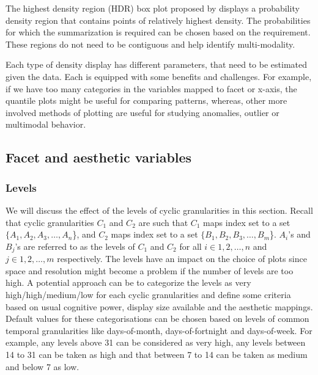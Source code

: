 \documentclass[12pt]{article}
\begin{document}
The highest density region (HDR) box plot proposed by \citep{Hyndman1996-ft} displays a probability density region that contains points of relatively highest density. The probabilities for which the summarization is required can be chosen based on the requirement. These regions do not need to be contiguous and help identify multi-modality.

Each type of density display has different parameters, that need to be estimated given the data. Each is equipped with some benefits and challenges. For example, if we have too many categories in the variables mapped to facet or x-axis, the quantile plots might be useful for comparing patterns, whereas, other more involved methods of plotting are useful for studying anomalies, outlier or multimodal behavior.

\hypertarget{facet-and-aesthetic-variables}{%
\subsection{Facet and aesthetic variables}\label{facet-and-aesthetic-variables}}

\hypertarget{levels}{%
\subsubsection{Levels}\label{levels}}

We will discuss the effect of the levels of cyclic granularities in this section. Recall that cyclic granularities \(C_1\) and \(C_2\) are such that \(C_1\) maps index set to a set \(\{A_1, A_2, A_3, \dots, A_n\)\}, and \(C_2\) maps index set to a set \(\{B_1, B_2, B_3, \dots, B_m\)\}. \(A_i\)'s and \(B_j\)'s are referred to as the levels of \(C_1\) and \(C_2\) for all \(i \in {1, 2, \dots, n}\) and \(j \in {1, 2, \dots, m}\) respectively. The levels have an impact on the choice of plots since space and resolution might become a problem if the number of levels are too high. A potential approach can be to categorize the levels as very high/high/medium/low for each cyclic granularities and define some criteria based on usual cognitive power, display size available and the aesthetic mappings. Default values for these categorisations can be chosen based on levels of common temporal granularities like days-of-month, days-of-fortnight and days-of-week. For example, any levels above 31 can be considered as very high, any levels between 14 to 31 can be taken as high and that between 7 to 14 can be taken as medium and below 7 as low.
\end{document}
